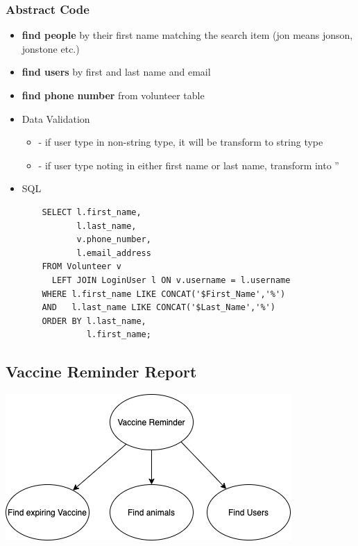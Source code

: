 \documentclass[a4paper]{article}
\begin{document}
\subsubsection*{Abstract Code}

\begin{itemize}
	\item \textbf{find people} by their first name matching the search item (jon means jonson, jonstone etc.)
	\item \textbf{find users} by first and last name and email
    \item \textbf{find phone number} from volunteer table

    \item Data Validation
    \begin{itemize}

        \item - if user type in non-string type, it will be transform to string type
        \item - if user type noting in either first name or last name, transform into ''

    \end{itemize}

    \item SQL
    \begin{verbatim}
    SELECT l.first_name,
           l.last_name,
           v.phone_number,
           l.email_address
    FROM Volunteer v
      LEFT JOIN LoginUser l ON v.username = l.username
    WHERE l.first_name LIKE CONCAT('$First_Name','%')
    AND   l.last_name LIKE CONCAT('$Last_Name','%')
    ORDER BY l.last_name,
             l.first_name;
\end{verbatim}


\end{itemize}




\hypertarget{vaccine_reminder_report}{
\subsection{Vaccine Reminder Report }}
\includegraphics[scale = 0.6]{vaccine_reminder.png}
\end{document}
